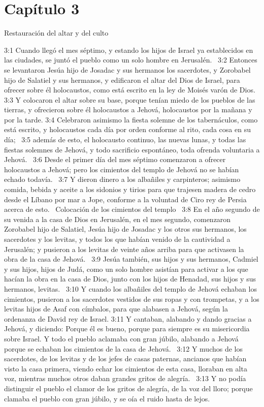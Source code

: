\section*{Capítulo 3}
Restauración del altar y del culto  

3:1 Cuando llegó el mes séptimo, y estando los hijos de Israel ya establecidos en las ciudades, se juntó el pueblo como un solo hombre en Jerusalén.  
3:2 Entonces se levantaron Jesúa hijo de Josadac y sus hermanos los sacerdotes, y Zorobabel hijo de Salatiel y sus hermanos, y edificaron el altar del Dios de Israel, para ofrecer sobre él holocaustos, como está escrito en la ley de Moisés varón de Dios.  
3:3 Y colocaron el altar sobre su base, porque tenían miedo de los pueblos de las tierras, y ofrecieron sobre él holocaustos a Jehová, holocaustos por la mañana y por la tarde. 
3:4 Celebraron asimismo la fiesta solemne de los tabernáculos, como está escrito, y holocaustos cada día por orden conforme al rito, cada cosa en su día;  
3:5 además de esto, el holocausto continuo, las nuevas lunas, y todas las fiestas solemnes de Jehová, y todo sacrificio espontáneo, toda ofrenda voluntaria a Jehová.  
3:6 Desde el primer día del mes séptimo comenzaron a ofrecer holocaustos a Jehová; pero los cimientos del templo de Jehová no se habían echado todavía.  
3:7 Y dieron dinero a los albañiles y carpinteros; asimismo comida, bebida y aceite a los sidonios y tirios para que trajesen madera de cedro desde el Líbano por mar a Jope, conforme a la voluntad de Ciro rey de Persia acerca de esto.  
Colocación de los cimientos del templo  
3:8 En el año segundo de su venida a la casa de Dios en Jerusalén, en el mes segundo, comenzaron Zorobabel hijo de Salatiel, Jesúa hijo de Josadac y los otros sus hermanos, los sacerdotes y los levitas, y todos los que habían venido de la cautividad a Jerusalén; y pusieron a los levitas de veinte años arriba para que activasen la obra de la casa de Jehová.  
3:9 Jesúa también, sus hijos y sus hermanos, Cadmiel y sus hijos, hijos de Judá, como un solo hombre asistían para activar a los que hacían la obra en la casa de Dios, junto con los hijos de Henadad, sus hijos y sus hermanos, levitas.  
3:10 Y cuando los albañiles del templo de Jehová echaban los cimientos, pusieron a los sacerdotes vestidos de sus ropas y con trompetas, y a los levitas hijos de Asaf con címbalos, para que alabasen a Jehová, según la ordenanza de David rey de Israel. 
3:11 Y cantaban, alabando y dando gracias a Jehová, y diciendo: Porque él es bueno, porque para siempre es su misericordia sobre Israel. Y todo el pueblo aclamaba con gran júbilo, alabando a Jehová porque se echaban los cimientos de la casa de Jehová.  
3:12 Y muchos de los sacerdotes, de los levitas y de los jefes de casas paternas, ancianos que habían visto la casa primera, viendo echar los cimientos de esta casa, lloraban en alta voz, mientras muchos otros daban grandes gritos de alegría.  
3:13 Y no podía distinguir el pueblo el clamor de los gritos de alegría, de la voz del lloro; porque clamaba el pueblo con gran júbilo, y se oía el ruido hasta de lejos.  
